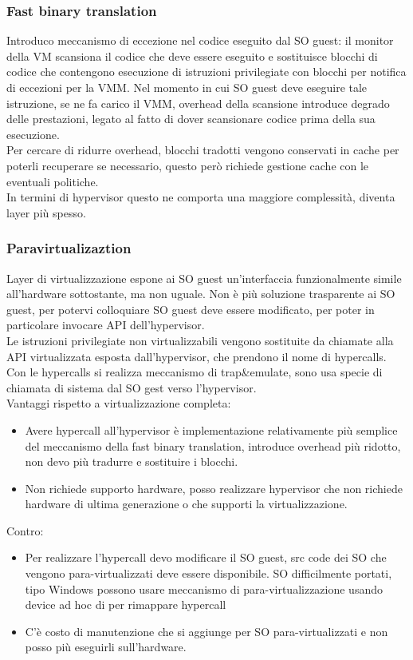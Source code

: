 \documentclass{article}
\begin{document}
\subsubsection{Fast binary translation}
Introduco meccanismo di eccezione nel codice eseguito dal SO guest: il monitor della VM scansiona il codice che deve essere eseguito e sostituisce blocchi di codice che contengono esecuzione di istruzioni privilegiate con blocchi per notifica di eccezioni per la VMM. Nel momento in cui SO guest deve eseguire tale istruzione, se ne fa carico il VMM, overhead della scansione introduce degrado delle prestazioni, legato al fatto di dover scansionare codice prima della sua esecuzione.\\ Per cercare di ridurre overhead, blocchi tradotti vengono conservati in cache per poterli recuperare se necessario, questo però richiede gestione cache con le eventuali politiche.\\ In termini di hypervisor questo ne comporta una maggiore complessità, diventa layer più spesso.
\subsubsection{Paravirtualizaztion}
Layer di virtualizzazione espone ai SO guest un'interfaccia funzionalmente simile all'hardware sottostante, ma non uguale. Non è più soluzione trasparente ai SO guest, per potervi colloquiare SO guest deve essere modificato, per poter in particolare invocare API dell'hypervisor.\\ Le istruzioni privilegiate non virtualizzabili vengono sostituite da chiamate alla API virtualizzata esposta dall'hypervisor, che prendono il nome di hypercalls.\\ Con le hypercalls si realizza meccanismo di trap\&emulate, sono usa specie di chiamata di sistema dal SO gest verso l'hypervisor.\\ Vantaggi rispetto a virtualizzazione completa:
\begin{itemize}
\item Avere hypercall all'hypervisor è implementazione relativamente più semplice del meccanismo della fast binary translation, introduce overhead più ridotto, non devo più tradurre e sostituire i blocchi.
\item Non richiede supporto hardware, posso realizzare hypervisor che non richiede hardware di ultima generazione o che supporti la virtualizzazione.
\end{itemize}
Contro:
\begin{itemize}
\item Per realizzare l'hypercall devo modificare il SO guest, src code dei SO che vengono para-virtualizzati  deve essere disponibile. SO difficilmente portati, tipo Windows possono usare meccanismo di para-virtualizzazione usando device ad hoc di per rimappare hypercall
\item C'è costo di manutenzione che si aggiunge per SO para-virtualizzati e non posso più eseguirli sull'hardware.
\end{itemize}
\end{document}

